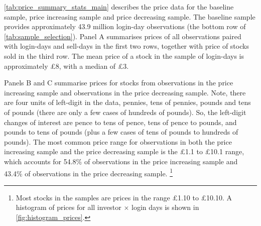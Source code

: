 \ref{tab:price_summary_stats_main} describes the price data for the baseline sample, price increasing sample and price decreasing sample. The baseline sample provides approximately 43.9 million login-day observations (the bottom row of \ref{tab:sample_selection}). Panel A summarises prices of all observations paired with login-days and sell-days in the first two rows, together with price of stocks sold in the third row. The mean price of a stock in the sample of login-days is approximately \pounds8, with a median of \pounds3. 

Panels B and C summarise prices for stocks from observations in the price increasing sample and observations in the price decreasing sample. Note, there are four units of left-digit in the data, pennies, tens of pennies, pounds and tens of pounds (there are only a few cases of hundreds of pounds). So, the left-digit changes of interest are pence to tens of pence, tens of pence to pounds, and pounds to tens of pounds (plus a few cases of tens of pounds to hundreds of pounds). The most common price range for observations in both the price increasing sample and the price decreasing sample is the \pounds1.1 to \pounds10.1 range, which accounts for 54.8\% of observations in the price increasing sample and 43.4\% of observations in the price decreasing sample. \footnote{Most stocks in the samples are prices in the range \pounds1.10 to \pounds10.10. A histogram of prices for all investor $\times$ login days is shown in \ref{fig:histogram_prices}.}


